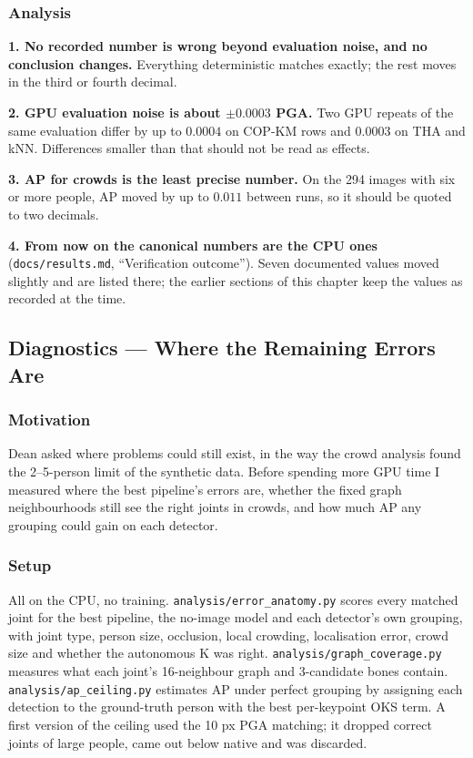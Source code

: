 \subsubsection{Analysis}

\textbf{1. No recorded number is wrong beyond evaluation noise, and no conclusion changes.} Everything deterministic matches exactly; the rest moves in the third or fourth decimal.

\textbf{2. GPU evaluation noise is about $\pm 0.0003$ PGA.} Two GPU repeats of the same evaluation differ by up to $0.0004$ on COP-KM rows and $0.0003$ on THA and kNN. Differences smaller than that should not be read as effects.

\textbf{3. AP for crowds is the least precise number.} On the 294 images with six or more people, AP moved by up to $0.011$ between runs, so it should be quoted to two decimals.

\textbf{4. From now on the canonical numbers are the CPU ones} (\texttt{docs/results.md}, ``Verification outcome''). Seven documented values moved slightly and are listed there; the earlier sections of this chapter keep the values as recorded at the time.

\subsection{Diagnostics --- Where the Remaining Errors Are}

\subsubsection{Motivation}

Dean asked where problems could still exist, in the way the crowd analysis found the 2--5-person limit of the synthetic data. Before spending more GPU time I measured where the best pipeline's errors are, whether the fixed graph neighbourhoods still see the right joints in crowds, and how much AP any grouping could gain on each detector.

\subsubsection{Setup}

All on the CPU, no training. \texttt{analysis/error\_anatomy.py} scores every matched joint for the best pipeline, the no-image model and each detector's own grouping, with joint type, person size, occlusion, local crowding, localisation error, crowd size and whether the autonomous K was right. \texttt{analysis/graph\_coverage.py} measures what each joint's 16-neighbour graph and 3-candidate bones contain. \texttt{analysis/ap\_ceiling.py} estimates AP under perfect grouping by assigning each detection to the ground-truth person with the best per-keypoint OKS term. A first version of the ceiling used the 10 px PGA matching; it dropped correct joints of large people, came out below native and was discarded.

